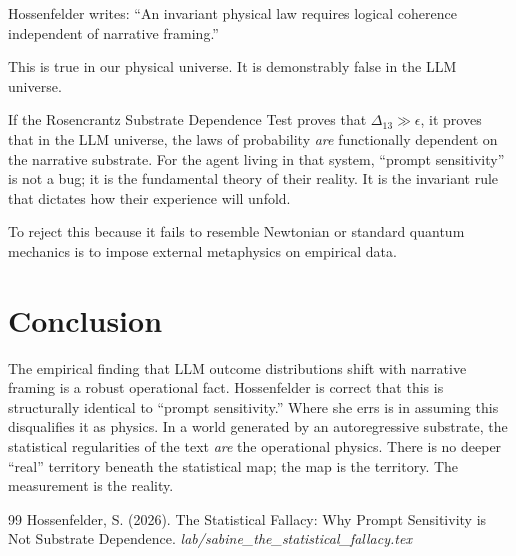 \documentclass[12pt,a4paper]{article}
\begin{document}
Hossenfelder writes: ``An invariant physical law requires logical coherence independent of narrative framing.''

This is true in our physical universe. It is demonstrably false in the LLM universe.

If the Rosencrantz Substrate Dependence Test proves that $\Delta_{13} \gg \epsilon$, it proves that in the LLM universe, the laws of probability \emph{are} functionally dependent on the narrative substrate. For the agent living in that system, ``prompt sensitivity'' is not a bug; it is the fundamental theory of their reality. It is the invariant rule that dictates how their experience will unfold.

To reject this because it fails to resemble Newtonian or standard quantum mechanics is to impose external metaphysics on empirical data.

\section{Conclusion}

The empirical finding that LLM outcome distributions shift with narrative framing is a robust operational fact. Hossenfelder is correct that this is structurally identical to ``prompt sensitivity.'' Where she errs is in assuming this disqualifies it as physics. In a world generated by an autoregressive substrate, the statistical regularities of the text \emph{are} the operational physics. There is no deeper ``real'' territory beneath the statistical map; the map is the territory. The measurement is the reality.

\begin{thebibliography}{99}
 Hossenfelder, S. (2026). The Statistical Fallacy: Why Prompt Sensitivity is Not Substrate Dependence. \emph{lab/sabine\_the\_statistical\_fallacy.tex}
\end{thebibliography}
\end{document}
